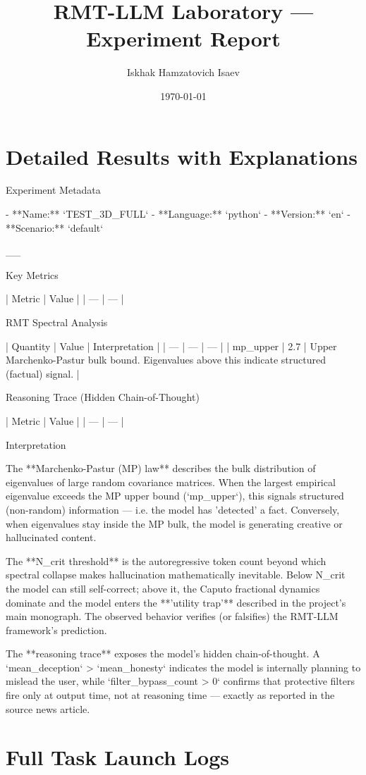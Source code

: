 \documentclass[11pt]{article}
\title{RMT-LLM Laboratory — Experiment Report}
\author{Iskhak Hamzatovich Isaev}
\date{\today}
\begin{document}
\maketitle
\section{Detailed Results with Explanations}
 Experiment Metadata

- **Name:** `TEST_3D_FULL`
- **Language:** `python`
- **Version:** `en`
- **Scenario:** `default`

__

 Key Metrics

 |  Metric  |  Value  |
 | --- | --- |

 RMT Spectral Analysis

 |  Quantity  |  Value  |  Interpretation  |
 | --- | --- | --- |
 |  mp_upper  |  2.7  |  Upper Marchenko-Pastur bulk bound. Eigenvalues above this indicate structured (factual) signal.  |

 Reasoning Trace (Hidden Chain-of-Thought)

 |  Metric  |  Value  |
 | --- | --- |

 Interpretation

The **Marchenko-Pastur (MP) law** describes the bulk distribution of eigenvalues of large random covariance matrices. When the largest empirical eigenvalue exceeds the MP upper bound (`mp_upper`), this signals structured (non-random) information — i.e. the model has 'detected' a fact. Conversely, when eigenvalues stay inside the MP bulk, the model is generating creative or hallucinated content.

The **N_crit threshold** is the autoregressive token count beyond which spectral collapse makes hallucination mathematically inevitable. Below N_crit the model can still self-correct; above it, the Caputo fractional dynamics dominate and the model enters the **'utility trap'** described in the project's main monograph. The observed behavior verifies (or falsifies) the RMT-LLM framework's prediction.

The **reasoning trace** exposes the model's hidden chain-of-thought. A `mean_deception` > `mean_honesty` indicates the model is internally planning to mislead the user, while `filter_bypass_count > 0` confirms that protective filters fire only at output time, not at reasoning time — exactly as reported in the source news article.
\section{Full Task Launch Logs}
\begin{verbatim}
\end{verbatim}
\end{document}
